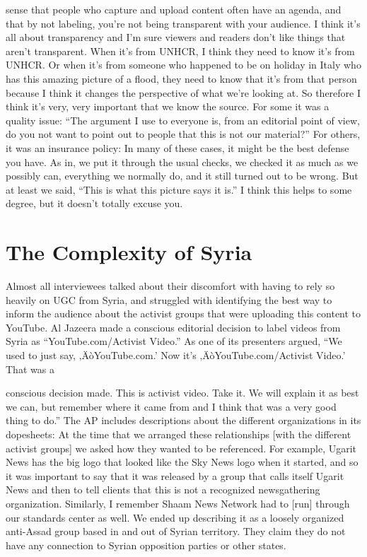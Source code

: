 \documentclass[symmetric, notoc, nobib]{towcenter-book}
\begin{document}
sense that people who capture and upload content often have an agenda,
and that by not labeling, you're not being transparent with your audience.
I think it's all about transparency and I'm sure viewers and readers
don't like things that aren't transparent. When it's from UNHCR, I
think they need to know it's from UNHCR. Or when it's from someone
who happened to be on holiday in Italy who has this amazing
picture of a flood, they need to know that it's from that person
because I think it changes the perspective of what we're looking at.
So therefore I think it's very, very important that we know the source.
For some it was a quality issue: ``The argument I use to everyone is, from an
editorial point of view, do you not want to point out to people that this is
not our material?'' For others, it was an insurance policy:
In many of these cases, it might be the best defense you have. As
in, we put it through the usual checks, we checked it as much as we
possibly can, everything we normally do, and it still turned out to be
wrong. But at least we said, ``This is what this picture says it is.'' I think
this helps to some degree, but it doesn't totally excuse you.
\section{The Complexity of Syria}
Almost all interviewees talked about their discomfort with having to rely
so heavily on UGC from Syria, and struggled with identifying the best way
to inform the audience about the activist groups that were uploading this
content to YouTube.
Al Jazeera made a conscious editorial decision to label videos from Syria as
``YouTube.com/Activist Video.'' As one of its presenters argued, ``We used to
just say, ‚ÄòYouTube.com.' Now it's ‚ÄòYouTube.com/Activist Video.' That was a

conscious decision made. This is activist video. Take it. We will explain it as
best we can, but remember where it came from and I think that was a very
good thing to do.''
The AP includes descriptions about the different organizations in
its dopesheets:
At the time that we arranged these relationships [with the different
activist groups] we asked how they wanted to be referenced.
For example, Ugarit News has the big logo that looked like the Sky
News logo when it started, and so it was important to say that it was
released by a group that calls itself Ugarit News and then to tell clients
that this is not a recognized newsgathering organization. Similarly,
I remember Shaam News Network had to [run] through our
standards center as well. We ended up describing it as a loosely organized
anti-Assad group based in and out of Syrian territory. They
claim they do not have any connection to Syrian opposition parties
or other states.
\end{document}
